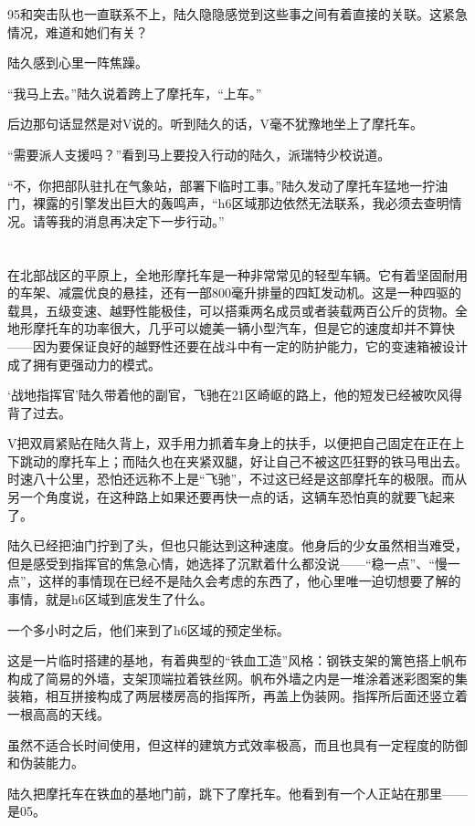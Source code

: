 95和突击队也一直联系不上，陆久隐隐感觉到这些事之间有着直接的关联。这紧急情况，难道和她们有关？

陆久感到心里一阵焦躁。

“我马上去。”陆久说着跨上了摩托车，“上车。”

后边那句话显然是对V说的。听到陆久的话，V毫不犹豫地坐上了摩托车。

“需要派人支援吗？”看到马上要投入行动的陆久，派瑞特少校说道。

“不，你把部队驻扎在气象站，部署下临时工事。”陆久发动了摩托车猛地一拧油门，裸露的引擎发出巨大的轰鸣声，“h6区域那边依然无法联系，我必须去查明情况。请等我的消息再决定下一步行动。”

\section*{}

在北部战区的平原上，全地形摩托车是一种非常常见的轻型车辆。它有着坚固耐用的车架、减震优良的悬挂，还有一部800毫升排量的四缸发动机。这是一种四驱的载具，五级变速、越野性能极佳，可以搭乘两名成员或者装载两百公斤的货物。全地形摩托车的功率很大，几乎可以媲美一辆小型汽车，但是它的速度却并不算快——因为要保证良好的越野性还要在战斗中有一定的防护能力，它的变速箱被设计成了拥有更强动力的模式。

‘战地指挥官’陆久带着他的副官，飞驰在21区崎岖的路上，他的短发已经被吹风得背了过去。

V把双肩紧贴在陆久背上，双手用力抓着车身上的扶手，以便把自己固定在正在上下跳动的摩托车上；而陆久也在夹紧双腿，好让自己不被这匹狂野的铁马甩出去。时速八十公里，恐怕还远称不上是“飞驰”，不过这已经是这部摩托车的极限。而从另一个角度说，在这种路上如果还要再快一点的话，这辆车恐怕真的就要飞起来了。

陆久已经把油门拧到了头，但也只能达到这种速度。他身后的少女虽然相当难受，但是感受到指挥官的焦急心情，她选择了沉默着什么都没说——“稳一点”、“慢一点”，这样的事情现在已经不是陆久会考虑的东西了，他心里唯一迫切想要了解的事情，就是h6区域到底发生了什么。

一个多小时之后，他们来到了h6区域的预定坐标。

这是一片临时搭建的基地，有着典型的“铁血工造”风格：钢铁支架的篱笆搭上帆布构成了简易的外墙，支架顶端拉着铁丝网。帆布外墙之内是一堆涂着迷彩图案的集装箱，相互拼接构成了两层楼房高的指挥所，再盖上伪装网。指挥所后面还竖立着一根高高的天线。

虽然不适合长时间使用，但这样的建筑方式效率极高，而且也具有一定程度的防御和伪装能力。

陆久把摩托车在铁血的基地门前，跳下了摩托车。他看到有一个人正站在那里——是05。

